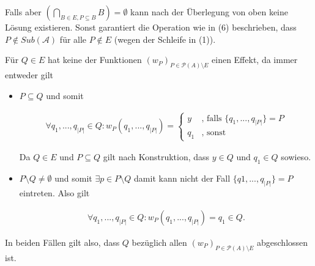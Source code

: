 \documentclass[]{article}
\begin{document}
	Falls aber $\left(\bigcap_{B \in E, P\subseteq B}B\right) = \emptyset$ kann nach der Überlegung von oben keine Lösung existieren. Sonst garantiert die Operation wie in (6) beschrieben, dass $P \notin Sub(\mathcal{A})$ für alle $P \notin E$ (wegen der Schleife in (1)).
	
	Für $Q \in E$ hat keine der Funktionen $(w_P)_{P\in \mathcal{P}(A)\setminus E}$ einen Effekt, da immer entweder gilt
	
	\begin{itemize}
		\item $P \subseteq Q$ und somit
		
		\begin{align*}
			\forall q_1, ..., q_{|P|} \in Q: w_P(q_1, ..., q_{|P|}) = \begin{cases}
				y & \text{, falls } \{q_1, ..., q_{|P|}\} = P\\
				q_1 & \text{, sonst}
			\end{cases}
		\end{align*}
	
		Da $Q \in E$ und $P \subseteq Q$ gilt nach Konstruktion, dass $y \in Q$ und $q_1 \in Q$ sowieso.
		
		\item $P\setminus Q \neq \emptyset$ und somit $\exists p \in P\setminus Q$ damit kann nicht der Fall $\{q1, ..., q_{|P|}\} = P$ eintreten. Also gilt
		
		\begin{align*}
			\forall q_1, ..., q_{|P|} \in Q: w_P(q_1, ..., q_{|P|}) = q_1 \in Q.
		\end{align*}
	\end{itemize}

	In beiden Fällen gilt also, dass $Q$ bezüglich allen $(w_P)_{P\in \mathcal{P}(A)\setminus E}$ abgeschlossen ist.
\end{document}
